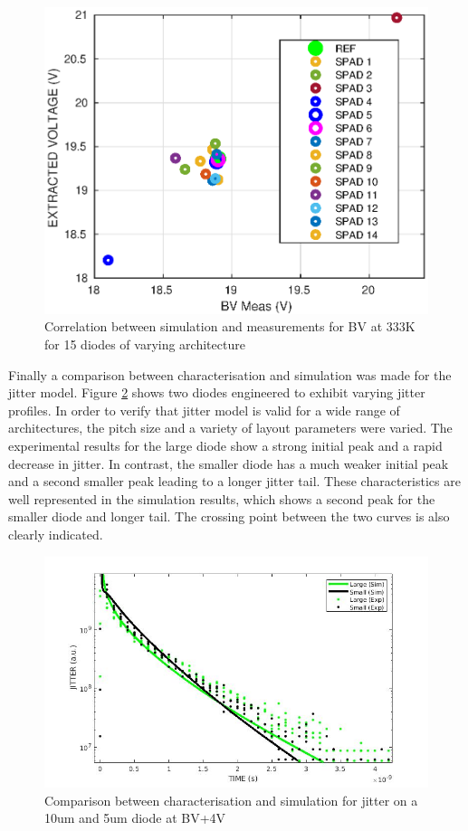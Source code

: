 \documentclass[10pt,a4paper,twocolumn]{article}
\begin{document}
\begin{figure}[h!]
\centering
\includegraphics[scale=0.65]{../pictures/000_McIntyre_Bench_GR5_graphs_BV.eps}
\caption{Correlation between simulation and measurements for BV at 333K for 15 diodes of varying architecture}
\label{fig:BVCorrel}
\end{figure}

Finally a comparison between characterisation and simulation was made for the jitter model. Figure \ref{fig:jitter} shows two diodes engineered to exhibit varying jitter profiles. In order to verify that jitter model is valid for a wide range of architectures, the pitch size and a variety of layout parameters were varied. The experimental results for the large diode show a strong initial peak and a rapid decrease in jitter. In contrast, the smaller diode has a much weaker initial peak and a second smaller peak leading to a longer jitter tail. These characteristics are well represented in the simulation results, which shows a second peak for the smaller diode and longer tail. The crossing point between the two curves is also clearly indicated.

\begin{figure}[h!]
\centering
\includegraphics[width=0.9\linewidth]{../pictures/000_JITTER_ESSDERC.jpg}
\caption{Comparison between characterisation and simulation for jitter on a 10um and 5um diode at BV+4V}
\label{fig:jitter}
\end{figure}
\end{document}
